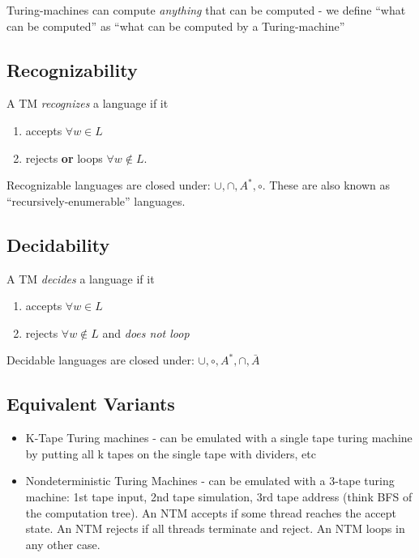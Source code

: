 Turing-{}machines can compute \emph{anything} that can be computed -{} we define ``what can be computed'' as ``what can be computed by a Turing-{}machine''

\subsection{Recognizability}
\label{recognizability}

A TM \emph{recognizes} a language if it

\begin{enumerate}
\item accepts $\forall w\in L$

\item rejects \textbf{or} loops $\forall w\notin L$.

\end{enumerate}

Recognizable languages are closed under: $\cup,\cap,A^*,\circ$. These are also known as ``recursively-{}enumerable'' languages.

\subsection{Decidability}
\label{decidability}

A TM \emph{decides} a language if it

\begin{enumerate}
\item accepts $\forall w\in L$

\item rejects $\forall w\notin L$ and \emph{does not loop}

\end{enumerate}

Decidable languages are closed under: $\cup, \circ, A^*, \cap,\bar{A}$

\subsection{Equivalent Variants}
\label{equivalentvariants}

\begin{itemize}
\item K-{}Tape Turing machines -{} can be emulated with a single tape turing machine by putting all k tapes on the single tape with dividers, etc

\item Nondeterministic Turing Machines -{} can be emulated with a 3-{}tape turing machine: 1st tape input, 2nd tape simulation, 3rd tape address (think BFS of the computation tree). An NTM accepts if some thread reaches the accept state. An NTM rejects if all threads terminate and reject. An NTM loops in any other case.

\end{itemize}

